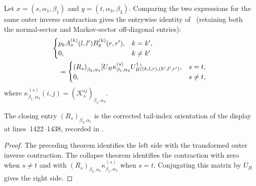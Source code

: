 \begin{lemma}
    \label{thm:mpdo_bnt_markov_key_formula}
    \leanok
    Let $x=(s,\alpha_1,\beta_1)$ and
    $y=(t,\alpha_3,\beta_3)$. Comparing the two expressions for the same
    outer inverse contraction gives the entrywise identity of~\cite[Appendix~C.2, lines~1719--1732]{Cirac2016MPDO_arXiv}
    (retaining both the normal-sector and Markov-sector off-diagonal entries):
    \begin{align}
         &
        \begin{cases}
            p_k A_x^{(k)}(l,l')B_y^{(k)}(r,r'), & k=k',   \\
            0,                                  & k\ne k'
        \end{cases}
        \notag    \\
         & \quad=
        \begin{cases}
            {(R_s)}_{\beta_3,\alpha_1}
                [U_B\kappa^{(s)}_{\beta_1,\alpha_3}U_B^\dagger]_
            {(k,l,r),(k',l',r')}, & s=t,    \\
            0,                    & s\ne t,
        \end{cases}
        \notag
    \end{align}
    where
    $\kappa^{(s)}_{\beta_1,\alpha_3}(i,j)
        ={(\mathcal K_s^{ij})}_{\beta_1,\alpha_3}$.

    The closing entry ${(R_s)}_{\beta_3,\alpha_1}$ is the corrected tail-index
    orientation of the display at lines~1422--1438, recorded in
    \cite{gap:cpgsv17_mpdo_sal_zcl_eta_local_structure}.
\end{lemma}

\begin{proof}\leanok
    The preceding theorem identifies the left side with the transformed outer
    inverse contraction. The collapse theorem identifies the contraction
    with zero when $s\ne t$ and with
    ${(R_s)}_{\beta_3,\alpha_1}
        \kappa^{(s)}_{\beta_1,\alpha_3}$ when $s=t$.
    Conjugating this matrix by $U_B$ gives the right side.
\end{proof}

